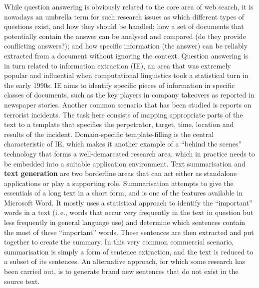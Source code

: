 \begin{multicols}{2}
While question answering is obviously related to the core area of web search, it is nowadays an umbrella term for such research issues as which different types of questions exist, and how they should be handled; how a set of documents that potentially contain the answer can be analysed and compared (do they provide conflicting answers?); and how specific information (the answer) can be reliably extracted from a document without ignoring the context. Question answering is in turn related to information extraction (IE), an area that was extremely popular and influential when computational linguistics took a statistical turn in the early 1990s. IE aims to identify specific pieces of information in specific classes of documents, such as the key players in company takeovers as reported in newspaper stories. Another common scenario that has been studied is reports on terrorist incidents. The task here consists of mapping appropriate parts of the text to a template that specifies the perpetrator, target, time, location and results of the incident. Domain-specific template-filling is the central characteristic of IE, which makes it another example of a “behind the scenes” technology that forms a well-demarcated research area, which in practice needs to be embedded into a suitable application environment.
Text summarisation and \textbf{text generation} are two borderline areas that can act either as standalone applications or play a supporting role. Summarisation attempts to give the essentials of a long text in a short form, and is one of the features available in Microsoft Word. It mostly uses a statistical approach to identify the “important” words in a text (i.\,e., words that occur very frequently in the text in question but less frequently in general language use) and determine which sentences contain the most of these “important” words. These sentences are then extracted and put together to create the summary. In this very common commercial scenario, summarisation is simply a form of sentence extraction, and the text is reduced to a subset of its sentences. An alternative approach, for which some research has been carried out, is to generate brand new sentences that do not exist in the source text.

\end{multicols}
